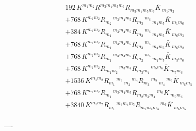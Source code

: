\begin{align}
&192\,K^{{m_{1}} {m_{2}}} R^{{m_{3}} {m_{4}} {m_{5}} {m_{6}}} R_{{m_{3}} {m_{4}} {m_{5}} {m_{6}}} \bar{K}\,_{{m_{1}} {m_{2}}}\\
&+768\,K^{{m_{1}} {m_{2}}} R_{{m_{2}}}\,^{{m_{3}} {m_{4}} {m_{5}}} R_{{m_{3}}}\,^{{m_{6}}}\,_{{m_{4}} {m_{5}}} \bar{K}\,_{{m_{1}} {m_{6}}}\\
&+384\,K^{{m_{1}} {m_{2}}} R_{{m_{1}}}\,^{{m_{3}} {m_{4}} {m_{5}}} R_{{m_{2}}}\,^{{m_{6}}}\,_{{m_{4}} {m_{5}}} \bar{K}\,_{{m_{6}} {m_{3}}}\\
&+768\,K^{{m_{1}} {m_{2}}} R_{{m_{1}}}\,^{{m_{3}} {m_{4}} {m_{5}}} R_{{m_{3}}}\,^{{m_{6}}}\,_{{m_{4}} {m_{5}}} \bar{K}\,_{{m_{6}} {m_{2}}}\\
&+768\,K^{{m_{1}} {m_{2}}} R_{{m_{1}}}\,^{{m_{3}} {m_{4}} {m_{5}}} R_{{m_{2}}}\,^{{m_{6}}}\,_{{m_{4}} {m_{5}}} \bar{K}\,_{{m_{3}} {m_{6}}}\\
&+768\,K^{{m_{1}} {m_{2}}} R_{{m_{1}} {m_{2}}}\,^{{m_{3}} {m_{4}}} R_{{m_{3}} {m_{4}}}\,^{{m_{5}} {m_{6}}} \bar{K}\,_{{m_{5}} {m_{6}}}\\
&+1536\,K^{{m_{1}} {m_{2}}} R_{{m_{1}}}\,^{{m_{3}}}\,_{{m_{2}}}\,^{{m_{4}}} R_{{m_{3}}}\,^{{m_{5}}}\,_{{m_{4}}}\,^{{m_{6}}} \bar{K}\,_{{m_{6}} {m_{5}}}\\
&+768\,K^{{m_{1}} {m_{2}}} R_{{m_{1}}}\,^{{m_{3}} {m_{4}} {m_{5}}} R_{{m_{2}} {m_{3}} {m_{4}}}\,^{{m_{6}}} \bar{K}\,_{{m_{5}} {m_{6}}}\\
&+3840\,K^{{m_{1}} {m_{2}}} R_{{m_{1}}}\,^{{m_{3}} {m_{4}} {m_{5}}} R_{{m_{2}} {m_{4}} {m_{3}}}\,^{{m_{6}}} \bar{K}\,_{{m_{6}} {m_{5}}}\\
\end{align}

----

